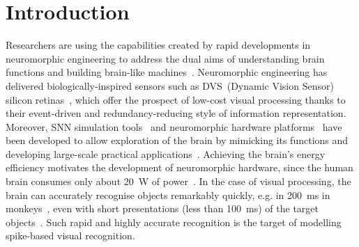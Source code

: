 \section{Introduction}
\label{sec:chapt6_intro}
Researchers are using the capabilities created by rapid developments in neuromorphic engineering to address the dual aims of understanding brain functions and building brain-like machines~\cite{furber2007neural}.
Neuromorphic engineering has delivered biologically-inspired sensors such as DVS~(Dynamic Vision Sensor) silicon retinas~\cite{serrano2013128, delbruck2008frame, yang2015dynamic, posch2014retinomorphic}, which offer the prospect of low-cost visual processing thanks to their event-driven and redundancy-reducing style of information representation.
Moreover, SNN simulation tools~\cite{davison2008pynn, gewaltig2007nest, goodman2008brian} and neuromorphic hardware platforms~\cite{furber2014spinnaker,  schemmel2010wafer,benjamin2014neurogrid,merolla2014million} have been developed to allow exploration of the brain by mimicking its functions and developing large-scale practical applications~\cite{eliasmith2012large}.
Achieving the brain's energy efficiency motivates the development of neuromorphic hardware, since the human brain consumes only about 20~W of power~\cite{drubach2000brain}.
In the case of visual processing, the brain can accurately recognise objects remarkably quickly, e.g. in 200~ms in monkeys~\cite{fabre1998rapid}, even with short presentations (less than 100~ms) of the target objects~\cite{keysers2001speed}.
Such rapid and highly accurate recognition is the target of modelling spike-based visual recognition.



